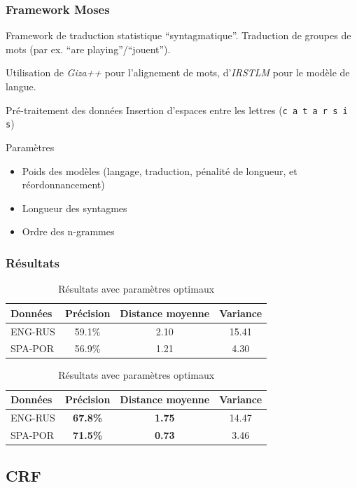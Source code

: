 \documentclass{beamer}
\begin{document}
\begin{frame}[fragile]
    \frametitle{Framework Moses}
    Framework de traduction statistique ``syntagmatique''. Traduction de groupes de mots (par ex. ``are playing''/``jouent'').

    Utilisation de \emph{Giza++} pour l'alignement de mots, d'\emph{IRSTLM} pour le modèle de langue.

    \begin{block}{Pré-traitement des données}
        Insertion d'espaces entre les lettres (\verb|c a t a r s i s|)
    \end{block}
    \begin{block}{Paramètres}
        \begin{itemize}
            \item Poids des modèles (langage, traduction, pénalité de longueur, et réordonnancement)
            \item Longueur des syntagmes
            \item Ordre des n-grammes
        \end{itemize}
    \end{block}

\end{frame}

\begin{frame}
    \frametitle{Résultats}
\begin{table}[H]
\caption{Résultats de la baseline (paramètres par défaut)}
\label{table_baseline_smt}
\begin{tabular}{|l|c|c|c|}
\hline
Données&Précision&Distance moyenne&Variance\\
\hline
ENG-RUS&59.1\%&2.10&15.41\\
\hline
SPA-POR&56.9\%&1.21&4.30\\
\hline
\end{tabular}

\caption{Résultats avec paramètres optimaux}
\label{table_opt_smt}
\begin{tabular}{|l|c|c|c|}
\hline
Données&Précision&Distance moyenne&Variance\\
\hline
ENG-RUS&\textbf{67.8\%}&\textbf{1.75}&14.47\\
\hline
SPA-POR&\textbf{71.5\%}&\textbf{0.73}&3.46\\
\hline
\end{tabular}
\end{table}
\end{frame}

\subsection{CRF}
\end{document}
